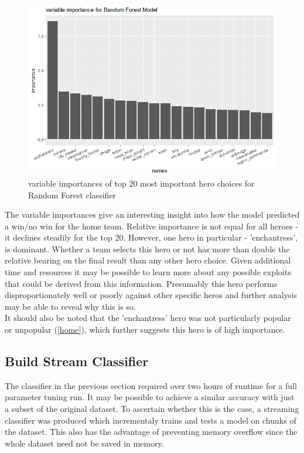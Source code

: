 \documentclass[10pt]{article}
\begin{document}
\begin{figure}[H]
\begin{center}
\includegraphics{vis}
\caption {variable importances of top 20 most important hero choices for Random Forest classifier}
\label{fig002}
\end {center}
\end {figure}

The variable importances give an interesting insight into how the model predicted a win/no win for the home team. Relative importance is not equal for all heroes - it declines steadily for the top 20. However, one hero in particular - 'enchantress', is dominant. Whether a team selects this hero or not has more than double the relative bearing on the final result than any other hero choice. Given additional time and resources it may be possible to learn more about any possible exploits that could be derived from this information. Presumably this hero performs disproportionately well or poorly against other specific heros and further analysis may be able to reveal why this is so.\\

It should also be noted that the 'enchantress' hero was not particularly popular or unpopular (\ref{home}), which further suggests this hero is of high importance.


  

\subsection{Build Stream Classifier}

The classifier in the previous section required over two hours of runtime for a full parameter tuning run. It may be possible to achieve a similar accuracy with just a subset of the original dataset. To ascertain whether this is the case, a streaming classifier was produced which incrementaly trains and tests a model on chunks of the dataset. This also has the advantage of preventing memory overflow since the whole dataset need not be saved in memory.
\end{document}

